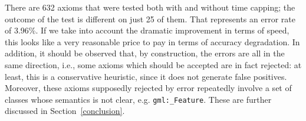 \documentclass{sig-alternate}
\begin{document}
There are 632 axioms that were tested both with and without time capping;
the outcome of the test is different on just 25 of them.
That represents an error rate of 3.96\%. If we take into account the dramatic
improvement in terms of speed, this looks like a very reasonable price to pay
in terms of accuracy degradation. In addition, it should be observed that,
by construction, the errors are all in the same direction, i.e., some axioms
which should be accepted are in fact rejected: at least, this is a conservative
heuristic, since it does not generate false positives.
Moreover, these axioms supposedly rejected by error repeatedly involve a set of classes whose semantics is not clear, e.g. \texttt{gml:\_Feature}. %
These are further discussed in Section~\ref{conclusion}.
\end{document}
